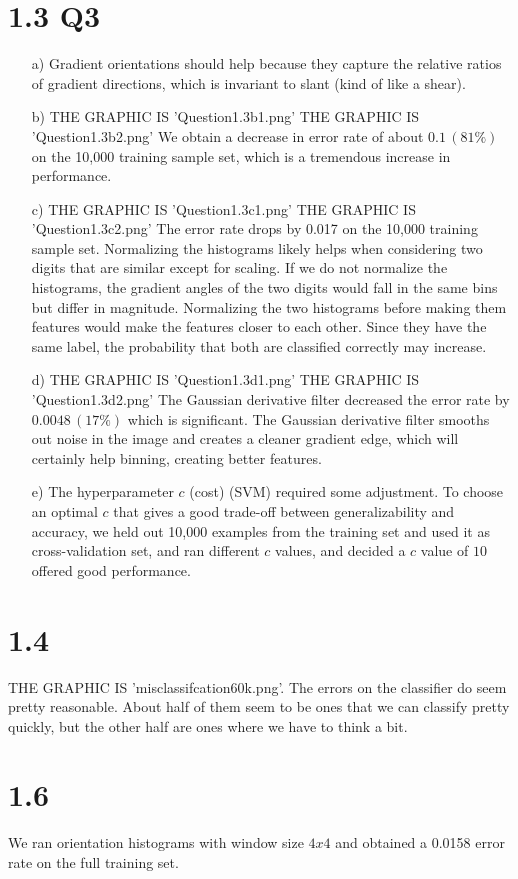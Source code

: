 \documentclass[11pt]{article}
\begin{document}
\section*{1.3 Q3}
\begin{itemize}
\item[a)]
Gradient orientations should help because they capture the relative ratios of gradient directions, which is invariant to slant (kind of like a shear).
\item[b)]
THE GRAPHIC IS 'Question1.3b1.png'
THE GRAPHIC IS 'Question1.3b2.png'
We obtain a decrease in error rate of about $0.1\,(81\%)$ on the 10,000 training sample set, which is a tremendous increase in performance.
\item[c)]
THE GRAPHIC IS 'Question1.3c1.png'
THE GRAPHIC IS 'Question1.3c2.png'
The error rate drops by 0.017 on the 10,000 training sample set. Normalizing the histograms  likely helps when considering two digits that are similar except for scaling. If we do not normalize the histograms, the gradient angles of the two digits would fall in the same bins but differ in magnitude. Normalizing the two histograms before making them features would make the features closer to each other. Since they have the same label, the probability that both are classified correctly may increase.
\item[d)]
THE GRAPHIC IS 'Question1.3d1.png'
THE GRAPHIC IS 'Question1.3d2.png'
The Gaussian derivative filter decreased the error rate by $0.0048\,(17\%)$ which is significant. The Gaussian derivative filter smooths out noise in the image and creates a cleaner gradient edge, which will certainly help binning, creating better features.
\item[e)]
The hyperparameter $c$ (cost) (SVM) required some adjustment. To choose an optimal $c$ that gives a good trade-off between generalizability and accuracy, we held out 10,000 examples from the training set and used it as cross-validation set, and ran different $c$ values, and decided a $c$ value of $10$ offered good performance.
\end{itemize}
\newpage
\section*{1.4}
THE GRAPHIC IS 'misclassifcation60k.png'.
The errors on the classifier do seem pretty reasonable. About half of them seem to be ones that we can classify pretty quickly, but the other half are ones where we have to think a bit.
\newpage
\section*{1.6}
We ran orientation histograms with window size $4x4$ and obtained a 0.0158 error rate on the full training set.
\end{document}
